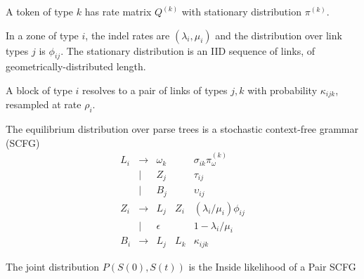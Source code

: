 \documentclass{article}
\begin{document}
A token of type $k$ has rate matrix $Q^{(k)}$ with stationary distribution $\pi^{(k)}$.

In a zone of type $i$, the indel rates are $(\lambda_i,\mu_i)$
and the distribution over link types $j$ is $\phi_{ij}$.
The stationary distribution is an IID sequence of links, of geometrically-distributed length.

A block of type $i$ resolves to a pair of links of types $j,k$ with probability $\kappa_{ijk}$,
resampled at rate $\rho_i$.

The equilibrium distribution over parse trees is a stochastic context-free grammar (SCFG)
\[
\begin{array}{rclll}
  L_i & \to & \omega_k & & \sigma_{ik} \pi^{(k)}_{\omega} \\
      & | & Z_j & & \tau_{ij} \\
      & | & B_j & & \upsilon_{ij} \\
  Z_i & \to & L_j & Z_i & (\lambda_i/\mu_i) \phi_{ij} \\
        & | & \epsilon & & 1 - \lambda_i/\mu_i \\
  B_i & \to & L_j & L_k & \kappa_{ijk}
\end{array}
\]

The joint distribution $P(S(0),S(t))$ is the Inside likelihood of a Pair SCFG
\end{document}
